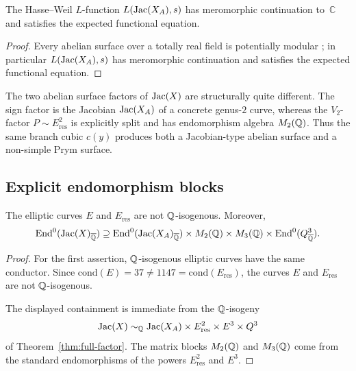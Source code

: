 \begin{corollary}\label{cor:potential-modularity}
The Hasse--Weil \(L\)-function \(L(\operatorname{Jac}(X_A),s)\) has meromorphic continuation to~\(\mathbb{C}\) and satisfies the expected functional equation.
\end{corollary}

\begin{proof}
Every abelian surface over a totally real field is potentially modular \cite{BCGP2021}; in particular \(L(\operatorname{Jac}(X_A),s)\) has meromorphic continuation and satisfies the expected functional equation.
\end{proof}

\begin{remark}\label{rem:structural-contrast}
The two abelian surface factors of \(\operatorname{Jac}(X)\) are structurally quite different. The sign factor is the Jacobian \(\operatorname{Jac}(X_A)\) of a concrete genus-\(2\) curve, whereas the \(V_2\)-factor \(P\sim E_{\mathrm{res}}^2\) is explicitly split and has endomorphism algebra \(M_2(\mathbb{Q})\). Thus the same branch cubic \(c(y)\) produces both a Jacobian-type abelian surface and a non-simple Prym surface.
\end{remark}

\subsection{Explicit endomorphism blocks}

\begin{proposition}\label{thm:non-isogeny}
The elliptic curves \(E\) and \(E_{\mathrm{res}}\) are not \(\mathbb{Q}\)-isogenous. Moreover,
\[
\operatorname{End}^0(\operatorname{Jac}(X)_{\overline{\mathbb{Q}}})
\supseteq
\operatorname{End}^0(\operatorname{Jac}(X_A)_{\overline{\mathbb{Q}}})
\times M_2(\mathbb{Q})\times M_3(\mathbb{Q})\times \operatorname{End}^0(Q^3_{\overline{\mathbb{Q}}}).
\]
\end{proposition}

\begin{proof}
For the first assertion, \(\mathbb{Q}\)-isogenous elliptic curves have the same conductor. Since \(\mathrm{cond}(E)=37\neq 1147=\mathrm{cond}(E_{\mathrm{res}})\), the curves \(E\) and \(E_{\mathrm{res}}\) are not \(\mathbb{Q}\)-isogenous.

The displayed containment is immediate from the \(\mathbb{Q}\)-isogeny
\[
\operatorname{Jac}(X)\sim_{\mathbb{Q}}\operatorname{Jac}(X_A)\times E_{\mathrm{res}}^2\times E^3\times Q^3
\]
of Theorem~\ref{thm:full-factor}. The matrix blocks \(M_2(\mathbb{Q})\) and \(M_3(\mathbb{Q})\) come from the standard endomorphisms of the powers \(E_{\mathrm{res}}^2\) and \(E^3\).
\end{proof}

